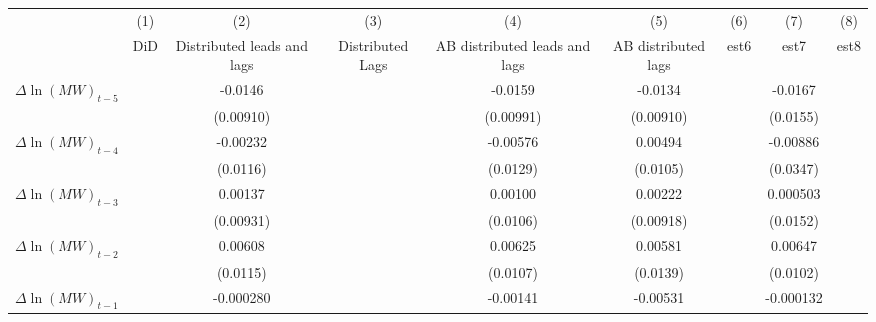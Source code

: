 {
\def\sym#1{\ifmmode^{#1}\else\(^{#1}\)\fi}
\begin{tabular}{l*{8}{c}}
\hline\hline
          &\multicolumn{1}{c}{(1)}&\multicolumn{1}{c}{(2)}&\multicolumn{1}{c}{(3)}&\multicolumn{1}{c}{(4)}&\multicolumn{1}{c}{(5)}&\multicolumn{1}{c}{(6)}&\multicolumn{1}{c}{(7)}&\multicolumn{1}{c}{(8)}\\
          &\multicolumn{1}{c}{DiD}&\multicolumn{1}{c}{Distributed leads and lags}&\multicolumn{1}{c}{Distributed Lags}&\multicolumn{1}{c}{AB distributed leads and lags}&\multicolumn{1}{c}{AB distributed lags}&\multicolumn{1}{c}{est6}&\multicolumn{1}{c}{est7}&\multicolumn{1}{c}{est8}\\
\hline
$\Delta \ln(MW)_{t-5}$&                  &  -0.0146         &                  &  -0.0159         &  -0.0134         &                  &  -0.0167         &                  \\
          &                  &(0.00910)         &                  &(0.00991)         &(0.00910)         &                  & (0.0155)         &                  \\
[1em]
$\Delta \ln(MW)_{t-4}$&                  & -0.00232         &                  & -0.00576         &  0.00494         &                  & -0.00886         &                  \\
          &                  & (0.0116)         &                  & (0.0129)         & (0.0105)         &                  & (0.0347)         &                  \\
[1em]
$\Delta \ln(MW)_{t-3}$&                  &  0.00137         &                  &  0.00100         &  0.00222         &                  & 0.000503         &                  \\
          &                  &(0.00931)         &                  & (0.0106)         &(0.00918)         &                  & (0.0152)         &                  \\
[1em]
$\Delta \ln(MW)_{t-2}$&                  &  0.00608         &                  &  0.00625         &  0.00581         &                  &  0.00647         &                  \\
          &                  & (0.0115)         &                  & (0.0107)         & (0.0139)         &                  & (0.0102)         &                  \\
[1em]
$\Delta \ln(MW)_{t-1}$&                  &-0.000280         &                  & -0.00141         & -0.00531         &                  &-0.000132         &                  \\

\end{tabular}}
